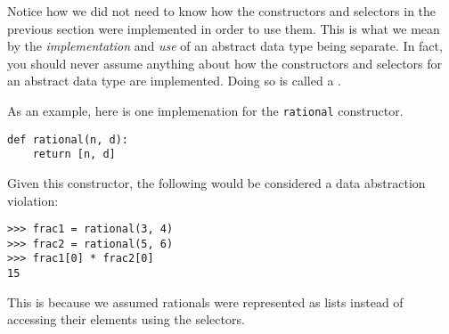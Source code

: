 Notice how we did not need to know how the constructors and selectors in the
previous section were implemented in order to use them. This is what we mean by
the \emph{implementation} and \emph{use} of an abstract data type being
separate.  In fact, you should never assume anything about how the constructors
and selectors for an abstract data type are implemented. Doing so is called a
.

As an example, here is one implemenation for the {\tt rational} constructor.

\begin{lstlisting}
def rational(n, d):
    return [n, d]
\end{lstlisting}

Given this constructor, the following would be considered a data abstraction
violation:

\begin{lstlisting}
>>> frac1 = rational(3, 4)
>>> frac2 = rational(5, 6)
>>> frac1[0] * frac2[0]
15
\end{lstlisting}

This is because we assumed rationals were represented as lists instead of
accessing their elements using the selectors.
